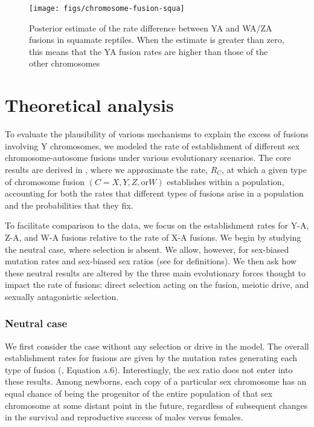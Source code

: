 \begin{figure}[p]
\centering
\texttt{[image: figs/chromosome-fusion-squa]}
\caption[Comparison of Y-autosome and W-/Z-autosome fusion rates (squamates)]{Posterior estimate of the rate difference between YA and WA/ZA fusions in squamate reptiles. When the estimate is greater than zero, this means that the YA fusion rates are higher than those of the other chromosomes}
\label{fig:squa-ind}
\end{figure}

\section{Theoretical analysis}

To evaluate the plausibility of various mechanisms to explain the excess of fusions involving Y chromosomes, we modeled the rate of establishment of different sex chromosome-autosome fusions under various evolutionary scenarios. The core results are derived in , where we approximate the rate, $R_C$, at which a given type of chromosome fusion $(C = X, Y, Z, \text{or} W)$ establishes within a population, accounting for both the rates that different types of fusions arise in a population and the probabilities that they fix.

To facilitate comparison to the data, we focus on the establishment rates for Y-A, Z-A, and W-A fusions relative to the rate of X-A fusions. We begin by studying the neutral case, where selection is absent. We allow, however, for sex-biased mutation rates and sex-biased sex ratios (see  for definitions). We then ask how these neutral results are altered by the three main evolutionary forces thought to impact the rate of fusions: direct selection acting on the fusion, meiotic drive, and sexually antagonistic selection.

\subsubsection{Neutral case}

We first consider the case without any selection or drive in the model. The overall establishment rates for fusions are given by the mutation rates generating each type of fusion (, Equation \textsc{a.6}). Interestingly, the sex ratio does not enter into these results. Among newborns, each copy of a particular sex chromosome has an equal chance of being the progenitor of the entire population of that sex chromosome at some distant point in the future, regardless of subsequent changes in the survival and reproductive success of males versus females. 

